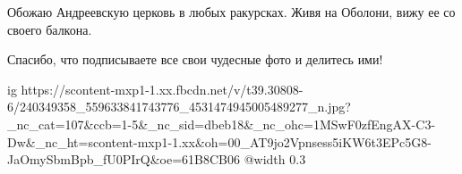  
 
 
 
 



Обожаю Андреевскую церковь в любых ракурсках. Живя на Оболони, вижу ее со своего балкона.

Спасибо, что подписываете все свои чудесные фото и делитесь ими!

\ifcmt
  ig https://scontent-mxp1-1.xx.fbcdn.net/v/t39.30808-6/240349358_559633841743776_4531474945005489277_n.jpg?_nc_cat=107&ccb=1-5&_nc_sid=dbeb18&_nc_ohc=1MSwF0zfEngAX-C3-Dw&_nc_ht=scontent-mxp1-1.xx&oh=00_AT9jo2Vpnsess5iKW6t3EPc5G8-JaOmySbmBpb_fU0PIrQ&oe=61B8CB06
  @width 0.3
\fi
